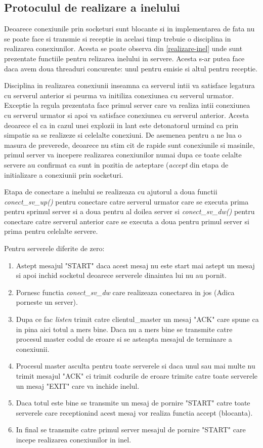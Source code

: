 \subsection{Protoculul de realizare a inelului}

\hspace{5mm} Deoarece conexiunile prin socketuri sunt blocante si in 
implementarea de fata nu se poate face si transmie si receptie in acelasi 
timp trebuie o disciplina in realizarea conexiunilor. Acesta se poate
observa din \ref{realizare-inel} unde sunt prezentate functiile pentru
relizarea inelului in servere.
Acesta s-ar putea face daca avem doua threaduri concurente: unul pentru 
emisie si altul pentru receptie.

Disciplina in realizarea conexiunii inseamna ca serverul intii va satisface
legatura cu serverul anterior si peurma va initiliza conexiunea cu serverul
urmator. Exceptie la regula prezentata face primul server care va realiza
intii conexiunea cu serverul urmator si apoi va satisface conexiunea cu
serverul anterior. Acesta deoarece el ca in cazul unei explozii in lant este
detonatorul urmind ca prin simpatie sa se realizeze si celelalte conexiuni.
De asemenea pentru a ne lua o masura de preverede, deoarece nu stim cit de
rapide sunt conexiunile si masinile, primul server va incepere realizarea
conexiunilor numai dupa ce toate celalte servere au confirmat ca sunt in
pozitia de asteptare ({\it accept} din etapa de initializare a conexiunii prin
socketuri.

Etapa de conectare a inelului se realizeaza cu ajutorul a doua functii {\it
conect\_sv\_up()} pentru conectare catre serverul urmator care se executa
prima pentru sprimul server si a doua pentru al doilea server si {\it
conect\_sv\_dw()} pentru conectare catre serverul anterior care se executa a
doua pentru primul server si prima pentru celelalte servere.

Pentru serverele diferite de zero:
\begin{enumerate}
\item Astept mesajul "START" daca acest mesaj nu este start mai astept un
mesaj si apoi inchid socketul deoarece serverele dinaintea lui nu au pornit.
\item Pornesc functia {\it conect\_sv\_dw} care realizeaza conectarea in jos
(Adica porneste un server). 
\item Dupa ce fac {\it listen} trimit catre clientul\_master un mesaj "ACK"
care spune ca in pina aici totul a mers bine. Daca nu a mers bine se
transmite catre procesul master codul de eroare si se asteapta mesajul de
terminare a conexiunii.
\item Procesul master asculta pentru toate serverele si daca unul sau mai
multe nu trimit mesajul "ACK" ci trimit codurile de eroare trimite catre
toate serverele un mesaj "EXIT" care va inchide inelul.
\item Daca totul este bine se transmite un mesaj de pornire "START" catre
toate serverele care receptionind acest mesaj vor realiza functia accept
(blocanta).
\item In final se transmite catre primul server mesajul de pornire "START"
care incepe realizarea conexiunilor in inel.
\end{enumerate}

